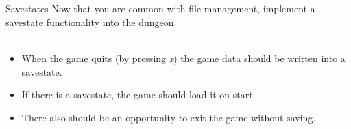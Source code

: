 \subsection{}
\begin{frame}{Savestates}
	Now that you are common with file management, implement a savestate functionality into the dungeon.\\\ \\
	\begin{itemize}
		\item When the game quits (by pressing \textit{x}) the game data should be written into a savestate.
		\item If there is a savestate, the game should load it on start.
		\item There also should be an opportunity to exit the game without saving.
	\end{itemize}
\end{frame}


